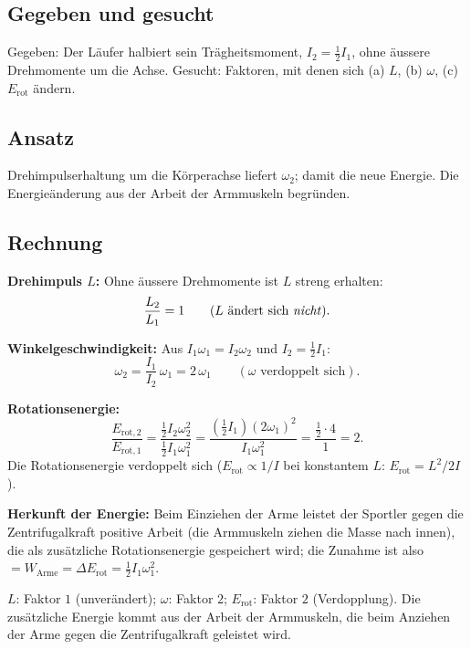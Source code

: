 
\subsection*{Gegeben und gesucht}
Gegeben: Der Läufer halbiert sein Trägheitsmoment, $I_2=\frac12 I_1$, ohne
äussere Drehmomente um die Achse.
Gesucht: Faktoren, mit denen sich (a) $L$, (b) $\omega$, (c) $E_\mathrm{rot}$
ändern.

\subsection*{Ansatz}
Drehimpulserhaltung um die Körperachse liefert $\omega_2$; damit die neue
Energie. Die Energieänderung aus der Arbeit der Armmuskeln begründen.

\subsection*{Rechnung}
\textbf{Drehimpuls $L$:} Ohne äussere Drehmomente ist $L$ streng erhalten:
\begin{equation}
  \frac{L_2}{L_1} = 1 \qquad (L\text{ ändert sich \emph{nicht}}).
\end{equation}

\textbf{Winkelgeschwindigkeit:} Aus $I_1\omega_1=I_2\omega_2$ und
$I_2=\frac12 I_1$:
\begin{equation}
  \omega_2 = \frac{I_1}{I_2}\,\omega_1 = 2\,\omega_1
  \qquad (\omega\text{ verdoppelt sich}).
\end{equation}

\textbf{Rotationsenergie:}
\begin{equation}
  \frac{E_\mathrm{rot,2}}{E_\mathrm{rot,1}}
  = \frac{\frac12 I_2\omega_2^2}{\frac12 I_1\omega_1^2}
  = \frac{(\frac12 I_1)(2\omega_1)^2}{I_1\omega_1^2}
  = \frac{\frac12\cdot 4}{1} = 2.
\end{equation}
Die Rotationsenergie verdoppelt sich ($E_\mathrm{rot}\propto 1/I$ bei
konstantem $L$: $E_\mathrm{rot}=L^2/2I$).

\textbf{Herkunft der Energie:} Beim Einziehen der Arme leistet der Sportler
gegen die Zentrifugalkraft positive Arbeit (die Armmuskeln ziehen die Masse
nach innen), die als zusätzliche Rotationsenergie gespeichert wird; die Zunahme
ist also $=W_\mathrm{Arme}=\Delta E_\mathrm{rot}=\frac12 I_1\omega_1^2$.

\begin{ergebnis}
$L$: Faktor $1$ (unverändert); $\omega$: Faktor $2$; $E_\mathrm{rot}$: Faktor
$2$ (Verdopplung). Die zusätzliche Energie kommt aus der Arbeit der Armmuskeln,
die beim Anziehen der Arme gegen die Zentrifugalkraft geleistet wird.
\end{ergebnis}

